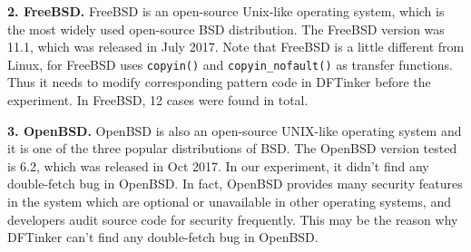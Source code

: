 \documentclass[10pt]{llncs}
\begin{document}



\textbf{2. FreeBSD.}
FreeBSD is an open-source Unix-like operating system, which is the most widely used open-source BSD distribution. The FreeBSD version was 11.1, which was released in July 2017. Note that FreeBSD is a little different from Linux, for FreeBSD uses \verb:copyin(): and \verb:copyin_nofault(): as transfer functions. Thus it needs to modify corresponding pattern code in DFTinker before the experiment. In FreeBSD, 12 cases were found in total.



\textbf{3. OpenBSD.}
OpenBSD is also an open-source UNIX-like operating system and it is one of the three popular distributions of BSD. The OpenBSD version tested is 6.2, which was released in Oct 2017. In our experiment, it didn't find any double-fetch bug in OpenBSD. In fact, OpenBSD provides many security features in the system which are optional or unavailable in other operating systems, and developers audit source code for security frequently. This may be the reason why DFTinker can't find any double-fetch bug in OpenBSD.
\end{document}

